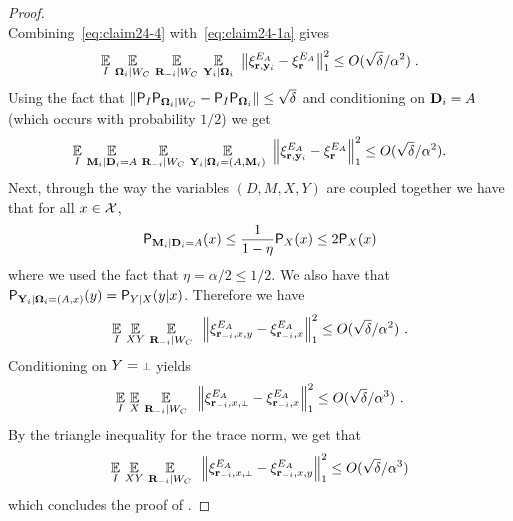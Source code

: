 \begin{proof}
\begin{equation}
\end{equation}
Combining~\eqref{eq:claim24-4} with~\eqref{eq:claim24-1a} gives
\[
	\operatorname*{\mathbb{E}}_I \, \operatorname*{\mathbb{E}}_{{\boldsymbol{\Omega}}_i | W_C} \, \operatorname*{\mathbb{E}}_{\mathbf{R}_{-i} | W_C} \, \operatorname*{\mathbb{E}}_{\mathbf{Y}_i | {\boldsymbol{\Omega}}_i} \,\, \big \| \xi^{E_A}_{\mathbf{r},\mathbf{y}_i} -  \xi^{E_A}_{\mathbf{r}} \big \|_1^2 \leq O(\sqrt{\delta}/\alpha^2)\;.
\]
Using the fact that $\| \mathsf{P}_I \mathsf{P}_{{\boldsymbol{\Omega}}_i | W_C} - \mathsf{P}_I \mathsf{P}_{{\boldsymbol{\Omega}}_i} \| \leq \sqrt{\delta}$ and conditioning on $\mathbf{D}_i = A$ (which occurs with probability $1/2$) we get
\[
	\operatorname*{\mathbb{E}}_I \, \operatorname*{\mathbb{E}}_{\mathbf{M}_i | \mathbf{D}_i =A} \, \operatorname*{\mathbb{E}}_{\mathbf{R}_{-i} | W_C} \, \operatorname*{\mathbb{E}}_{\mathbf{Y}_i | {\boldsymbol{\Omega}}_i=(A,\mathbf{M}_i)} \,\, \Big \| \xi^{E_A}_{\mathbf{r},\mathbf{y}_i} -  \xi^{E_A}_{\mathbf{r}} \Big \|_1^2 \leq O(\sqrt{\delta}/\alpha^2).
\]
Next, through the way the variables $(D,M,X,Y)$ are coupled together we have that for all $x \in \mathcal{X}$,
\[
	\mathsf{P}_{\mathbf{M}_i | \mathbf{D}_i = A}(x) \leq \frac{1}{1 - \eta} \mathsf{P}_X(x) \leq 2 \mathsf{P}_X(x)
\]
where we used the fact that $\eta = \alpha/2 \leq 1/2$. We also have that $\mathsf{P}_{\mathbf{Y}_i | {\boldsymbol{\Omega}}_i = (A,x)}(y) = \mathsf{P}_{Y | X}(y|x)$. Therefore we have
\[
	\operatorname*{\mathbb{E}}_I \, \operatorname*{\mathbb{E}}_{XY} \, \operatorname*{\mathbb{E}}_{\mathbf{R}_{-i} | W_C} \, \,\, \Big \| \xi^{E_A}_{\mathbf{r}_{-i},x,y} -  \xi^{E_A}_{\mathbf{r}_{-i},x} \Big \|_1^2 \leq O(\sqrt{\delta}/\alpha^2)~.
\]
Conditioning on $Y = \dummy$ yields
\[
	\Ex_I \, \Ex_{X} \, \Ex_{\bR_\mi | W_C} \, \,\, \Big \| \xi^{E_A}_{\br_\mi,x,\dummy} -  \xi^{E_A}_{\br_\mi,x} \Big \|_1^2 \leq O(\sqrt{\delta}/\alpha^3)~.
\]
By the triangle inequality for the trace norm, we get that
\[
\Ex_I \, \Ex_{XY} \, \Ex_{\bR_\mi | W_C} \, \,\, \Big \| \xi^{E_A}_{\br_\mi,x,\dummy} -  \xi^{E_A}_{\br_\mi,x,y} \Big \|_1^2 \leq O(\sqrt{\delta}/\alpha^3)
\]
which concludes the proof of .
%

\end{proof}
